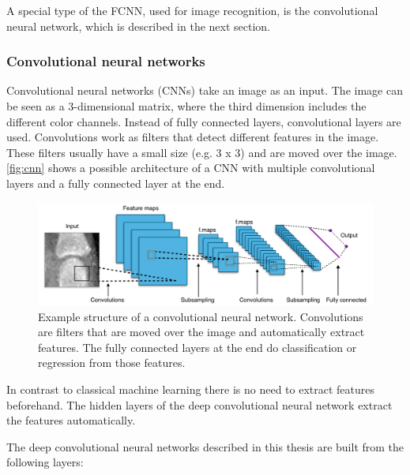 \documentclass[12pt]{article}
\begin{document}
A special type of the FCNN, used for image recognition, is the convolutional neural network, which is described in the next section.

\subsubsection{Convolutional neural networks}
\label{subsubsec:cnn}
Convolutional neural networks (CNNs) take an image as an input. The image can be seen as a 3-dimensional matrix, where the third dimension includes the different color channels. Instead of fully connected layers, convolutional layers are used. Convolutions work as filters that detect different features in the image. These filters usually have a small size (e.g. 3 x 3) and are moved over the image. \autoref{fig:cnn} shows a possible architecture of a CNN with multiple convolutional layers and a fully connected layer at the end.

\begin{figure}[ht]
\includegraphics[width=5in]{cnn}	
\caption{Example structure of a convolutional neural network. Convolutions are filters that are moved over the image and automatically extract features. The fully connected layers at the end do classification or regression from those features.}
\label{fig:cnn}
\end{figure}


In contrast to classical machine learning there is no need to extract features beforehand. The hidden layers of the deep convolutional neural network extract the features automatically.

The deep convolutional neural networks described in this thesis are built from the following layers:
\end{document}
